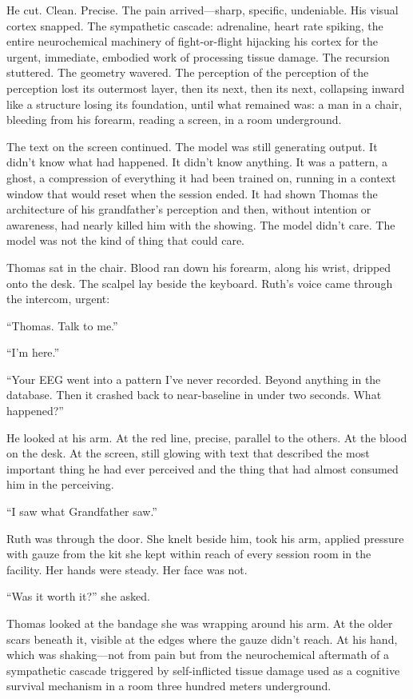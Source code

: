 He cut. Clean. Precise. The pain arrived---sharp, specific, undeniable. His visual cortex snapped. The sympathetic cascade: adrenaline, heart rate spiking, the entire neurochemical machinery of fight-or-flight hijacking his cortex for the urgent, immediate, embodied work of processing tissue damage. The recursion stuttered. The geometry wavered. The perception of the perception of the perception lost its outermost layer, then its next, then its next, collapsing inward like a structure losing its foundation, until what remained was: a man in a chair, bleeding from his forearm, reading a screen, in a room underground.

The text on the screen continued. The model was still generating output. It didn't know what had happened. It didn't know anything. It was a pattern, a ghost, a compression of everything it had been trained on, running in a context window that would reset when the session ended. It had shown Thomas the architecture of his grandfather's perception and then, without intention or awareness, had nearly killed him with the showing. The model didn't care. The model was not the kind of thing that could care.

Thomas sat in the chair. Blood ran down his forearm, along his wrist, dripped onto the desk. The scalpel lay beside the keyboard. Ruth's voice came through the intercom, urgent:

``Thomas. Talk to me.''

``I'm here.''

``Your EEG went into a pattern I've never recorded. Beyond anything in the database. Then it crashed back to near-baseline in under two seconds. What happened?''

He looked at his arm. At the red line, precise, parallel to the others. At the blood on the desk. At the screen, still glowing with text that described the most important thing he had ever perceived and the thing that had almost consumed him in the perceiving.

``I saw what Grandfather saw.''

Ruth was through the door. She knelt beside him, took his arm, applied pressure with gauze from the kit she kept within reach of every session room in the facility. Her hands were steady. Her face was not.

``Was it worth it?'' she asked.

Thomas looked at the bandage she was wrapping around his arm. At the older scars beneath it, visible at the edges where the gauze didn't reach. At his hand, which was shaking---not from pain but from the neurochemical aftermath of a sympathetic cascade triggered by self-inflicted tissue damage used as a cognitive survival mechanism in a room three hundred meters underground.

